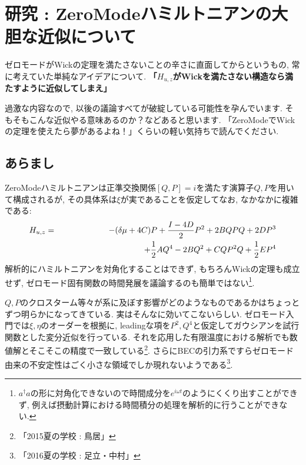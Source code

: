 \documentclass[10.5pt,a4paper]{jreport}
\begin{document}
\chapter{研究 : ZeroModeハミルトニアンの大胆な近似について}
ゼロモードがWickの定理を満たさないことの辛さに直面してからというもの, 常に考えていた単純なアイデアについて. \textbf{「$H_{u, z}$がWickを満たさない構造なら満たすように近似してしまえ」}

過激な内容なので, 以後の議論すべてが破綻している可能性を孕んでいます. そもそもこんな近似やる意味あるのか？などあると思います. 「ZeroModeでWickの定理を使えたら夢があるよね！」くらいの軽い気持ちで読んでください. 
\section{あらまし}
ZeroModeハミルトニアンは正準交換関係$[Q, P] = i$を満たす演算子$Q, P$を用いて構成されるが, その具体系は$\xi$が実であることを仮定してなお, なかなかに複雑である:
\begin{eqnarray}
  \nonumber H_{u, z} &=& -(\delta\mu +4C)P + \frac{I - 4D}{2}P^2 + 2BQPQ + 2DP^3\\
  &&\hspace{3.5cm} +\frac{1}{2}AQ^4- 2BQ^2 + CQP^2Q + \frac{1}{2}EP^4
\end{eqnarray}
解析的にハミルトニアンを対角化することはできず, もちろんWickの定理も成立せず, ゼロモード固有関数の時間発展を議論するのも簡単ではない\footnote{$a^\dagger a$の形に対角化できないので時間成分を$e^{i\omega t}$のようにくくり出すことができず, 例えば摂動計算における時間積分の処理を解析的に行うことができない. }.

$Q, P$のクロスターム等々が系に及ぼす影響がどのようなものであるかはちょっとずつ明らかになってきている. 実はそんなに効いてこないらしい. 
ゼロモード入門では$\xi, \eta$のオーダーを根拠に, leadingな項を$P^2, Q^4$と仮定してガウシアンを試行関数とした変分近似を行っている. それを応用した有限温度における解析でも数値解とそこそこの精度で一致している\footnote{「2015夏の学校 : 鳥居」}. さらにBECの引力系ですらゼロモード由来の不安定性はごく小さな領域でしか現れないようである\footnote{「2016夏の学校 : 足立・中村」}.
\end{document}
